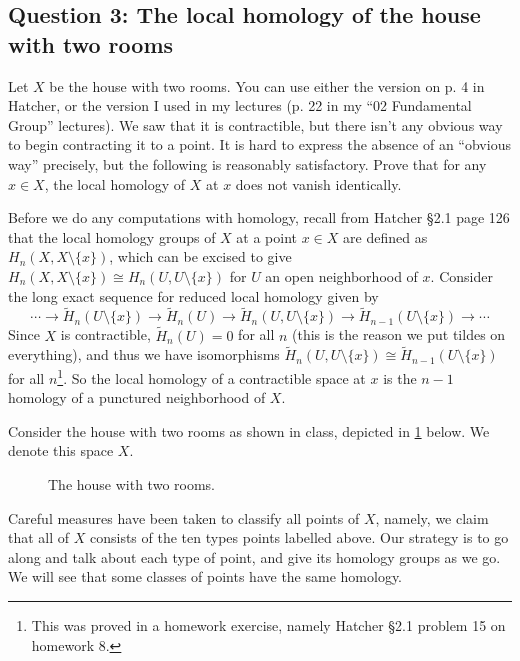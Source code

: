 \subsection{Question 3: The local homology of the house with two rooms}
\begin{prob}
    Let $X$ be the house with two rooms.  You can use either the version on p. 4 in Hatcher, or the version I used in my lectures (p. 22 in my ``02 Fundamental Group'' lectures).  We saw that it is contractible, but there isn't any obvious way to begin contracting it to a point.  It is hard to express the absence of an ``obvious way'' precisely, but the following is reasonably satisfactory.  Prove that for any $x\in X$, the local homology of $X$ at $x$ does not vanish identically.
\end{prob}
\begin{solution}
    Before we do any computations with homology, recall from Hatcher \S 2.1 page 126 that the local homology groups of $X$ at a point $x\in X$ are defined as $H_n (X, X\setminus \{x\} )$, which can be excised to give $H_n (X,X\setminus \{x\} ) \cong H_n (U, U\setminus \{x\} )$ for $U$ an open neighborhood of $x$. Consider the long exact sequence for reduced local homology given by\[
        \cdots \to \widetilde H_n (U \setminus \{x\} ) \to \widetilde H_n (U)\to \widetilde H_n (U, U\setminus \{x\} )\to \widetilde H_{n-1}(U \setminus \{x\} ) \to \cdots 
    \] Since $X$ is contractible, $\widetilde H_n (U)=0$ for all $n$ (this is the reason we put tildes on everything), and thus we have isomorphisms $\widetilde H_n (U, U \setminus \{x\} ) \cong \widetilde H _{n-1}(U\setminus \{x\} )$ for all $n$\footnote{This was proved in a homework exercise, namely Hatcher \S 2.1 problem 15 on homework 8.}. So the local homology of a contractible space at $x$ is the $n-1$ homology of a punctured neighborhood of $X$.

Consider the house with two rooms as shown in class, depicted in \cref{house} below. We denote this space $X$. 
    \begin{figure}[H]
    \centering
    \caption{The house with two rooms.}
    \label{house}
    \end{figure}
    Careful measures have been taken to classify all points of $X$, namely, we claim that all of $X$ consists of the ten types points labelled above. Our strategy is to go along and talk about each type of point, and give its homology groups as we go. We will see that some classes of points have the same homology.


\end{solution}
